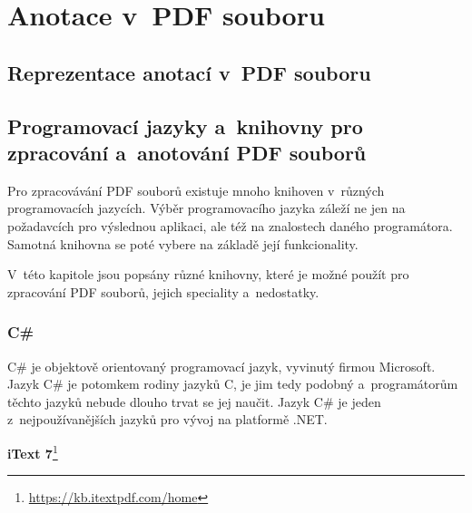 



\chapter{Anotace v~PDF souboru}

\dummyText


\section{Reprezentace anotací v~PDF souboru}

\DummyText


\section{Programovací jazyky a~knihovny pro zpracování a~anotování PDF souborů}

Pro zpracovávání PDF souborů existuje mnoho knihoven v~různých programovacích
jazycích. Výběr programovacího jazyka záleží ne jen na požadavcích pro výslednou
aplikaci, ale též na znalostech daného programátora. Samotná knihovna se poté
vybere na základě její funkcionality. 

V~této kapitole jsou popsány různé knihovny, které je možné použít pro zpracování
PDF souborů, jejich speciality a~nedostatky.


\subsection*{C\#}

C\# je objektově orientovaný programovací jazyk, vyvinutý firmou Microsoft.
Jazyk C\# je potomkem rodiny jazyků C, je jim tedy podobný a~programátorům těchto
jazyků nebude dlouho trvat se jej naučit. Jazyk C\# je jeden z~nejpoužívanějších
jazyků pro vývoj na platformě .NET.
\cite{CSharp}

\textbf{iText 7}\footnote{\href{https://kb.itextpdf.com/home}{https://kb.itextpdf.com/home}}
\dummyText


